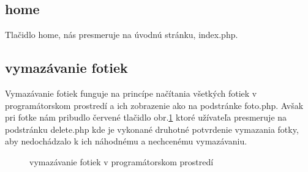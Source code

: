 \subsection{home}

Tlačidlo home, nás presmeruje na úvodnú stránku, index.php.

\subsection{vymazávanie fotiek}

Vymazávanie fotiek funguje na princípe načítania všetkých fotiek v programátorskom prostredí a ich zobrazenie ako na podstránke foto.php. Avšak pri fotke nám pribudlo červené tlačidlo obr.\ref{OBRAZOK 1.15} ktoré užívateľa presmeruje na podstránku delete.php kde je vykonané druhotné potvrdenie vymazania fotky, aby nedochádzalo k ich náhodnému a nechcenému vymazávaniu.

\begin{figure}[!tbh]
\centering
\setlength{\fboxsep}{0pt}%
\setlength{\fboxrule}{1pt}%
\caption{vymazávanie fotiek v programátorskom prostredí}\label{OBRAZOK 1.15}
\end{figure} 